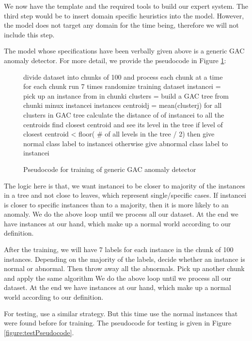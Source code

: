 \documentclass[conference]{IEEEtran}
\begin{document}
We now have the template and the required tools to build our expert
system.  The third step would be to insert domain specific heuristics
into the model.  However, the model does not target any domain for the
time being, therefore we will not include this step.

The model whose specifications have been verbally given above is a
generic GAC anomaly detector.  For more detail, we provide the
pseudocode in Figure \ref{figure:trainPseudocode}:

\begin{figure}
\renewcommand{\baselinestretch}{1}
\begin{algorithmic} \footnotesize
\STATE divide dataset into chunks of 100 and process each chunk at a time
\STATE for each chunk run 7 times
\STATE randomize training dataset
\STATE instancei = pick up an instance from in chunki 
\STATE clusters = build a GAC tree from chunki minux instancei instances
\STATE centroidj = mean(clusterj) for all clusters in GAC tree
\STATE calculate the distance of of instancei to all the centroids
\STATE  find closest centroid and see its level in the tree
\STATE if level of closest centroid < floor( \# of all levels in the tree / 2) 
\STATE then give normal class label to instancei
\STATE otherwise give abnormal class label to instancei
\end{algorithmic}
\caption{Pseudocode for training of generic GAC anomaly detector}
\label{figure:trainPseudocode}
\end{figure}

The logic here is that, we want instancei to be closer to majority of
the instances in a tree and not close to leaves, which represent
single/specific cases. If instancei is closer to specific instances
than to a majority, then it is more likely to an anomaly.  We do the
above loop until we process all our dataset. At the end we have
instances at our hand, which make up a normal world according to our
definition.

After the training, we will have 7 labels for each instance in the
chunk of 100 instances. Depending on the majority of the labels,
decide whether an instance is normal or abnormal. Then throw away all
the abnormals. Pick up another chunk and apply the same algorithm We
do the above loop until we process all our dataset. At the end we have
instances at our hand, which make up a normal world according to our
definition.

For testing, use a similar strategy. But this time use the normal
instances that were found before for training. The pseudocode for
testing is given in Figure \ref{figure:testPseudocode}.
\end{document}
